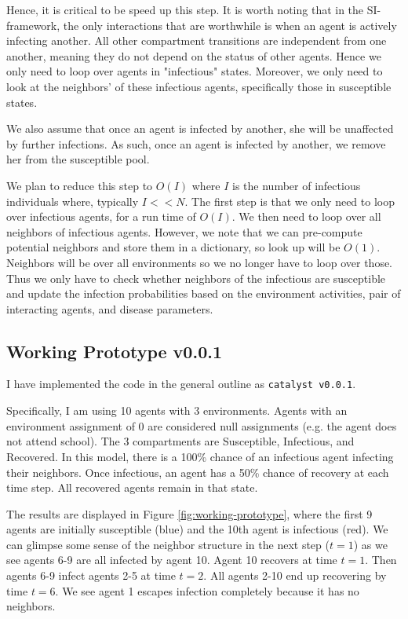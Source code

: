 \documentclass{article}
\begin{document}
Hence, it is critical to be speed up this step.  It is worth noting that in the SI-framework, the only interactions that are worthwhile is when an agent is actively infecting another.  All other compartment transitions are independent from one another, meaning they do not depend on the status of other agents.  Hence we only need to loop over agents in "infectious" states.  Moreover, we only need to look at the neighbors' of these infectious agents, specifically those in susceptible states.

We also assume that once an agent is infected by another, she will be unaffected by further infections.  As such, once an agent is infected by another, we remove her from the susceptible pool.

We plan to reduce this step to $O(I)$ where $I$ is the number of infectious individuals where, typically $I << N$.  The first step is that we only need to loop over infectious agents, for a run time of $O(I)$.  We then need to loop over all neighbors of infectious agents.  However, we note that we can pre-compute potential neighbors and store them in a dictionary, so look up will be $O(1)$.  Neighbors will be over all environments so we no longer have to loop over those.  Thus we only have to check whether neighbors of the infectious are susceptible and update the infection probabilities based on the environment activities, pair of interacting agents, and disease parameters.


\subsection{Working Prototype v0.0.1}
\label{sec-2-3}
I have implemented the code in the general outline as \texttt{catalyst v0.0.1}.

Specifically, I am using 10 agents with 3 environments.  Agents with an environment assignment of 0 are considered null assignments (e.g. the agent does not attend school).  The 3 compartments are Susceptible, Infectious, and Recovered.  In this model, there is a 100\% chance of an infectious agent infecting their neighbors.  Once infectious, an agent has a 50\% chance of recovery at each time step.  All recovered agents remain in that state.

The results are displayed in Figure \ref{fig:working-prototype}, where the first 9 agents are initially susceptible (blue) and the 10th agent is infectious (red).  We can glimpse some sense of the neighbor structure in the next step ($t=1$) as we see agents 6-9 are all infected by agent 10.  Agent 10 recovers at time $t=1$.  Then agents 6-9 infect agents 2-5 at time $t=2$.  All agents 2-10 end up recovering by time $t=6$.  We see agent 1 escapes infection completely because it has no neighbors.
\end{document}
